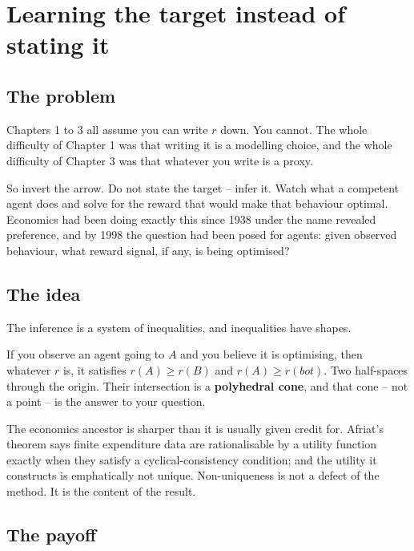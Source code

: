 \chapter{Learning the target instead of stating it}

\section*{The problem}

Chapters 1 to 3 all assume you can write $r$ down. You cannot. The whole difficulty of Chapter 1 was that writing it is a modelling choice, and the whole difficulty of Chapter 3 was that whatever you write is a proxy.

So invert the arrow. Do not state the target -- infer it. Watch what a competent agent does and solve for the reward that would make that behaviour optimal. Economics had been doing exactly this since 1938 under the name revealed preference, and by 1998 the question had been posed for agents: given observed behaviour, what reward signal, if any, is being optimised?

\section*{The idea}

The inference is a system of inequalities, and inequalities have shapes.

If you observe an agent going to $A$ and you believe it is optimising, then whatever $r$ is, it satisfies $r(A) \geq r(B)$ and $r(A) \geq r(bot)$. Two half-spaces through the origin. Their intersection is a \textbf{polyhedral cone}, and that cone -- not a point -- is the answer to your question.

The economics ancestor is sharper than it is usually given credit for. Afriat's theorem says finite expenditure data are rationalisable by a utility function exactly when they satisfy a cyclical-consistency condition; and the utility it constructs is emphatically not unique. Non-uniqueness is not a defect of the method. It is the content of the result.

\section*{The payoff}

